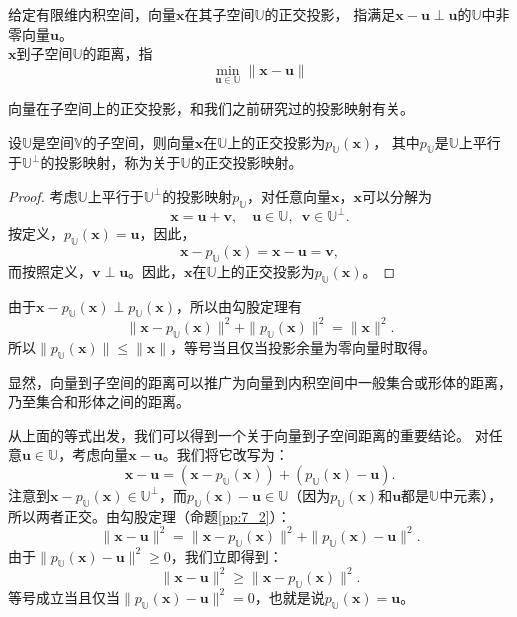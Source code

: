 \documentclass[12pt,UTF8,fontset=none]{ctexbook}
\begin{document}
\begin{df}\label{df:7_4}
    给定有限维内积空间，向量$\mathbf{x}$在其子空间$\mathbb{U}$的正交投影，
    指满足$\mathbf{x} - \mathbf{u} \perp \mathbf{u}$的$\mathbb{U}$中非零向量$\mathbf{u}$。\\
    $\mathbf{x}$到子空间$\mathbb{U}$的距离，指
    $$\min_{\mathbf{u}\in\mathbb{U}} \|\mathbf{x} - \mathbf{u}\|$$
\end{df}

向量在子空间上的正交投影，和我们之前研究过的投影映射有关。
\begin{pp}\label{pp:7_8}
    设$\mathbb{U}$是空间$\mathbb{V}$的子空间，则向量$\mathbf{x}$在$\mathbb{U}$上的正交投影为$p_\mathbb{U}(\mathbf{x})$，
    其中$p_\mathbb{U}$是$\mathbb{U}$上平行于$\mathbb{U}^\perp$的投影映射，称为关于$\mathbb{U}$的正交投影映射。
\end{pp}

\begin{proof} %
    考虑$\mathbb{U}$上平行于$\mathbb{U}^\perp$的投影映射$p_\mathbb{U}$，对任意向量$\mathbf{x}$，$\mathbf{x}$可以分解为
    $$ \mathbf{x} = \mathbf{u} + \mathbf{v}, \quad \mathbf{u} \in \mathbb{U}, \,\,\, \mathbf{v} \in \mathbb{U}^\perp . $$
    按定义，$p_\mathbb{U}(\mathbf{x}) = \mathbf{u}$，因此，
    $$ \mathbf{x} - p_\mathbb{U}(\mathbf{x}) = \mathbf{x} - \mathbf{u} = \mathbf{v},$$
    而按照定义，$\mathbf{v} \perp \mathbf{u}$。因此，$\mathbf{x}$在$\mathbb{U}$上的正交投影为$p_\mathbb{U}(\mathbf{x})$。

\end{proof}


由于$\mathbf{x} - p_\mathbb{U}(\mathbf{x}) \perp p_\mathbb{U}(\mathbf{x})$，所以由勾股定理有
$$ \| \mathbf{x} - p_\mathbb{U}(\mathbf{x})  \|^2 + \| p_\mathbb{U}(\mathbf{x}) \|^2 = \| \mathbf{x} \|^2.  $$
所以$\| p_\mathbb{U}(\mathbf{x}) \| \leqslant \| \mathbf{x} \|$，等号当且仅当投影余量为零向量时取得。

显然，向量到子空间的距离可以推广为向量到内积空间中一般集合或形体的距离，乃至集合和形体之间的距离。

从上面的等式出发，我们可以得到一个关于向量到子空间距离的重要结论。
对任意$\mathbf{u} \in \mathbb{U}$，考虑向量$\mathbf{x} - \mathbf{u}$。我们将它改写为：
$$ \mathbf{x} - \mathbf{u} = \left(\mathbf{x} - p_\mathbb{U}(\mathbf{x})\right) + \left(p_\mathbb{U}(\mathbf{x}) - \mathbf{u}\right). $$
注意到$\mathbf{x} - p_\mathbb{U}(\mathbf{x}) \in \mathbb{U}^\perp$，而$p_\mathbb{U}(\mathbf{x}) - \mathbf{u} \in \mathbb{U}$（因为$p_\mathbb{U}(\mathbf{x})$和$\mathbf{u}$都是$\mathbb{U}$中元素），
所以两者正交。由勾股定理（命题\ref{pp:7_2}）：
$$ \|\mathbf{x} - \mathbf{u}\|^2 = \|\mathbf{x} - p_\mathbb{U}(\mathbf{x})\|^2 + \|p_\mathbb{U}(\mathbf{x}) - \mathbf{u}\|^2. $$
由于$\|p_\mathbb{U}(\mathbf{x}) - \mathbf{u}\|^2 \geqslant 0$，我们立即得到：
$$ \|\mathbf{x} - \mathbf{u}\|^2 \geqslant \|\mathbf{x} - p_\mathbb{U}(\mathbf{x})\|^2. $$
等号成立当且仅当$\|p_\mathbb{U}(\mathbf{x}) - \mathbf{u}\|^2 = 0$，也就是说$p_\mathbb{U}(\mathbf{x}) = \mathbf{u}$。
\end{document}
